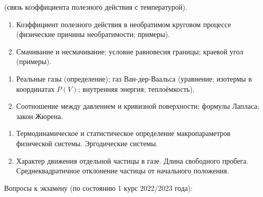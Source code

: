 \documentclass{article}
\newcounter{ticket}[subsection]
\newenvironment{ticket}[1][]{\item[Билет \ifthenelse{\equal{#1}{}}{}{\setcounter{ticket}{#1}}\theticket\refstepcounter{ticket}:]\phantom{}\begin{enumerate}}{\end{enumerate}}
\begin{document}
\begin{description}
\begin{ticket}[17]
		      (связь коэффициента полезного действия с температурой).
	\end{ticket}
	\begin{ticket}
		\item Коэффициент полезного действия в необратимом круговом процессе
		      (физические причины необратимости; примеры).
		\item Смачивание и несмачивание; условие равновесия границы;
		      краевой угол (примеры).
	\end{ticket}
	\begin{ticket}
		\item Реальные газы (определение); газ Ван-дер-Ваальса
		      (уравнение; изотермы в координатах $P(V)$; внутренняя энергия;
		      теплоёмкость).
		\item Соотношение между давлением и кривизной поверхности;
		      формулы Лапласа; закон Жюрена.
	\end{ticket}
	\begin{ticket}
		\item Термодинамическое и статистическое определение
		      макропараметров физической системы. Эргодические системы.
		\item Характер движения отдельной частицы в газе.
		      Длина свободного пробега. Среднеквадратичное отклонение
		      частицы от начального положения.
	\end{ticket}
\end{description}
Вопросы к экзамену (по состоянию 1 курс 2022/2023 года):
\end{document}
